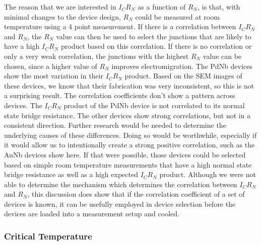 The reason that we are interested in $I_CR_N$ as a function of $R_N$, is that, with minimal changes to the device design, $R_N$ could be measured at room temperature using a 4 point measurement. If there is a correlation between $I_CR_N$ and $R_N$, the $R_N$ value can then be used to select the junctions that are likely to have a high $I_CR_N$ product based on this correlation. If there is no correlation or only a very weak correlation, the junctions with the highest $R_N$ value can be chosen, since a higher value of $R_N$ improves electromigration.  The PdNb devices show the most variation in their $I_CR_N$ product. Based on the SEM images of these devices, we know that their fabrication was very inconsistent, so this is not a surprising result. The correlation coefficients don't show a pattern across devices. The $I_CR_N$ product of the PdNb device is not correlated to its normal state bridge resistance. The other devices show strong correlations, but not in a consistent direction. Further research would be needed to determine the underlying causes of these differences. Doing so would be worthwhile, especially if it would allow us to intentionally create a strong positive correlation, such as the AuNb devices show here. If that were possible, those devices could be selected based on simple room temperature measurements that have a high normal state bridge resistance as well as a high expected $I_CR_N$ product. Although we were not able to determine the mechanism which determines the correlation between $I_CR_N$ and $R_N$, this discussion does show that if the correlation coefficient of a set of devices is known, it can be usefully employed in device selection before the devices are loaded into a measurement setup and cooled. 

\subsubsection{Critical Temperature}

